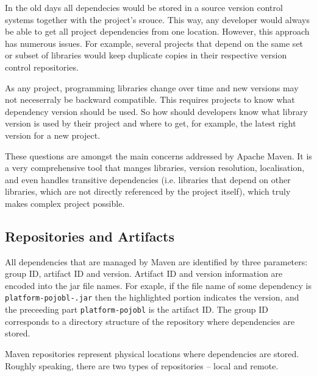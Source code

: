   In the old days all dependecies would be stored in a source version control systems together with the project's srouce.
  This way, any developer would always be able to get all project dependencies from one location.
  However, this approach has numerous issues.
  For example, several projects that depend on the same set or subset of libraries would keep duplicate copies in their respective version control repositories.

  As any project, programming libraries change over time and new versions may not neceserraly be backward compatible.
  This requires projects to know what dependency version should be used.
  So how should developers know what library version is used by their project and where to get, for example, the latest right version for a new project.

  These questions are amongst the main concerns addressed by Apache Maven.
  It is a very comprehensive tool that manges libraries, version resolution, localisation, and even handles transitive dependencies (i.e. libraries that depend on other libraries, which are not directly referenced by the project itself), which truly makes complex project possible.

  \subsection*{Repositories and Artifacts}
  All dependencies that are managed by Maven are identified by three parameters: group ID, artifact ID and version.
  Artifact ID and version information are encoded into the jar file names.
  For exaple, if the file name of some dependency is \texttt{platform-pojobl-.jar} then the highlighted portion \texttt{} indicates the version, and the preceeding part \texttt{platform-pojobl} is the artifact ID.
  The group ID corresponds to a directory structure of the repository where dependencies are stored.

  Maven repositories represent physical locations where dependencies are stored.
  Roughly speaking, there are two types of repositories -- local and remote.
  

